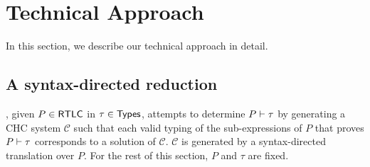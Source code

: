 \section{Technical Approach}
\label{s:approach}
%
In this section, we describe our technical approach in detail.

\subsection{A syntax-directed reduction}
\label{s:reduction}
%
\sys, given $P \in \mathsf{RTLC}$ in $\tau \in \mathsf{Types}$, attempts to determine
$P \vdash \tau$ by generating a CHC system $\mathcal{C}$ such that
each valid typing of the sub-expressions of $P$ that proves $P
\vdash \tau$ corresponds to a solution of $\mathcal{C}$.
%
$\mathcal{C}$ is generated by a syntax-directed translation over $P$.
%
For the rest of this section, $P$ and $\tau$ are fixed.

